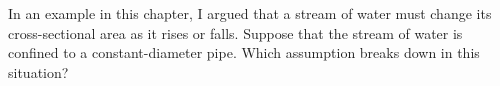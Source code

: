 In an example in this chapter, I argued that a stream of water must change
        its cross-sectional area as it rises or falls. Suppose that the stream of
        water is confined to a constant-diameter pipe. Which assumption breaks
        down in this situation?
